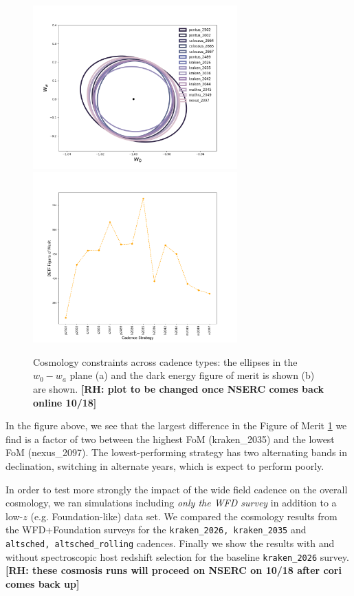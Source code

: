 \documentclass[a4paper,10pt]{article}
\begin{document}
\begin{figure}[htbp]
  \begin{center}
    \includegraphics[width=0.7\textwidth]{FM_plot_cadence_updated.png}
    \includegraphics[width=0.7\textwidth]{FoM_cadence_updated.png}
    \caption{Cosmology constraints across cadence types: the ellipses in the $w_0-w_a$ plane (a) and the dark energy figure of merit is shown (b) are shown. \textbf{[RH: plot to be changed once NSERC comes back online 10/18]}}
    \label{fig:w0wa}
  \end{center}
\end{figure}


In the figure above, we see that the largest difference in the Figure of Merit \ref{fig:w0wa} we find is a factor of two between the highest FoM (kraken\_2035) and the lowest FoM (nexus\_2097). The lowest-performing strategy has two alternating bands in declination, switching in alternate years, which is expect to perform poorly. 

In order to test more strongly the impact of the wide field cadence on the overall cosmology, we ran simulations including \textit{only the WFD survey} in addition to a low-$z$ (e.g. Foundation-like) data set. We compared the cosmology results from the WFD+Foundation surveys for the {\tt kraken\_2026, kraken\_2035} and {\tt altsched, altsched\_rolling} cadences. Finally we show the results with and without spectroscopic host redshift selection for the baseline {\tt kraken\_2026} survey. \textbf{[RH: these cosmosis runs will proceed on NSERC on 10/18 after cori comes back up]}
\end{document}
